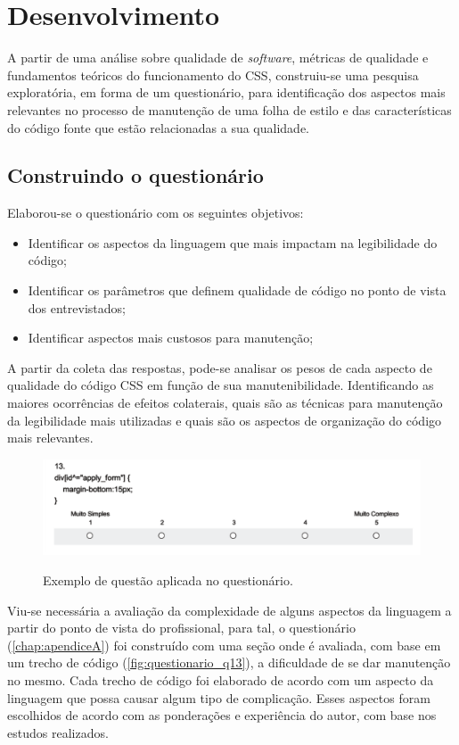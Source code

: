 \chapter{Desenvolvimento}

A partir de uma análise sobre qualidade de \textit{software}, métricas de qualidade e fundamentos teóricos do funcionamento do CSS, construiu-se uma pesquisa exploratória, em forma de um questionário, para identificação dos aspectos mais relevantes no processo de manutenção de uma folha de estilo e das características do código fonte que estão relacionadas a sua qualidade.

\section{Construindo o questionário}
Elaborou-se o questionário com os seguintes objetivos:

\begin{itemize}
	\item Identificar os aspectos da linguagem que mais impactam na legibilidade do código;
	\item Identificar os parâmetros que definem qualidade de código no ponto de vista dos entrevistados;
	\item Identificar aspectos mais custosos para manutenção;	
\end{itemize}

A partir da coleta das respostas, pode-se analisar os pesos de cada aspecto de qualidade do código CSS em função de sua manutenibilidade. Identificando as maiores ocorrências de efeitos colaterais, quais são as técnicas para manutenção da legibilidade mais utilizadas e quais são os aspectos de organização do código mais relevantes.

\begin{figure}[!htb]
	\centering
	\caption{Exemplo de questão aplicada no questionário.}
	\includegraphics[width=1\textwidth]{./04-figuras/questionario_q13}
	\label{fig:questionario_q13}
\end{figure}

Viu-se necessária a avaliação da complexidade de alguns aspectos da linguagem a partir do ponto de vista do profissional, para tal, o questionário (\autoref{chap:apendiceA}) foi construído com uma seção onde é avaliada, com base em um trecho de código (\autoref{fig:questionario_q13}), a dificuldade de se dar manutenção no mesmo. Cada trecho de código foi elaborado de acordo com um aspecto da linguagem que possa causar algum tipo de complicação. Esses aspectos foram escolhidos de acordo com as ponderações e experiência do autor, com base nos estudos realizados.

